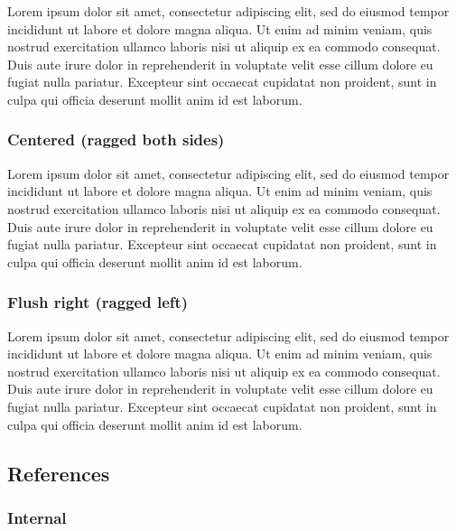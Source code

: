 \documentclass{metanorma}
\begin{document}
\begin{flushleft}
  Lorem ipsum dolor sit amet, consectetur adipiscing elit, sed do eiusmod tempor incididunt ut labore et dolore magna aliqua. Ut enim ad minim veniam, quis nostrud exercitation ullamco laboris nisi ut aliquip ex ea commodo consequat. Duis aute irure dolor in reprehenderit in voluptate velit esse cillum dolore eu fugiat nulla pariatur. Excepteur sint occaecat cupidatat non proident, sunt in culpa qui officia deserunt mollit anim id est laborum.
\end{flushleft}

\subsubsection{Centered (ragged both sides)}

\begin{center}
  Lorem ipsum dolor sit amet, consectetur adipiscing elit, sed do eiusmod tempor incididunt ut labore et dolore magna aliqua. Ut enim ad minim veniam, quis nostrud exercitation ullamco laboris nisi ut aliquip ex ea commodo consequat. Duis aute irure dolor in reprehenderit in voluptate velit esse cillum dolore eu fugiat nulla pariatur. Excepteur sint occaecat cupidatat non proident, sunt in culpa qui officia deserunt mollit anim id est laborum.
\end{center}

\subsubsection{Flush right (ragged left)}

\begin{flushright}
  Lorem ipsum dolor sit amet, consectetur adipiscing elit, sed do eiusmod tempor incididunt ut labore et dolore magna aliqua. Ut enim ad minim veniam, quis nostrud exercitation ullamco laboris nisi ut aliquip ex ea commodo consequat. Duis aute irure dolor in reprehenderit in voluptate velit esse cillum dolore eu fugiat nulla pariatur. Excepteur sint occaecat cupidatat non proident, sunt in culpa qui officia deserunt mollit anim id est laborum.
\end{flushright}

\subsection{References}

\subsubsection{Internal}
\end{document}
